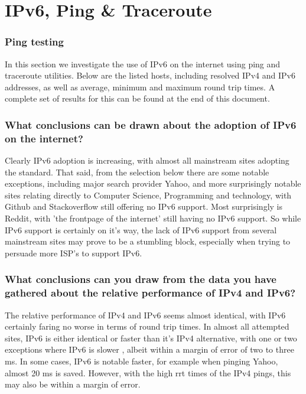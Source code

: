 \part{IPv6, Ping \& Traceroute}
\section{Ping testing}
\begin{normalsize}
In this section we investigate the use of IPv6 on the internet using ping and traceroute utilities.  Below are the listed hosts, including resolved IPv4 and IPv6 addresses, as well as average, minimum and maximum round trip times. A complete set of results for this can be found at the end of this document. 
\end{normalsize}
\section{What conclusions can be drawn about the adoption of IPv6 on the internet?}
\begin{normalsize}
Clearly IPv6 adoption is increasing, with almost all mainstream sites adopting the standard. That said, from the selection below there are some notable exceptions, including major search provider Yahoo, and more surprisingly notable sites relating directly to Computer Science, Programming and technology, with Github and Stackoverflow still offering no IPv6 support. Most surprisingly is Reddit, with 'the frontpage of the internet' still having no IPv6 support. So while IPv6 support is certainly on it's way, the lack of IPv6 support from several mainstream sites may prove to be a stumbling block, especially when trying to persuade more ISP's to support IPv6.
\end{normalsize}
\section{What conclusions can you draw from the data you have gathered about the relative performance of IPv4 and IPv6?}
\begin{normalsize}
The relative performance of IPv4 and IPv6 seems almost identical, with IPv6 certainly faring no worse in terms of round trip times. In almost all attempted sites, IPv6 is either identical or faster than it's IPv4 alternative, with one or two exceptions where IPv6 is slower , albeit within a margin of error of two to three ms. In some cases, IPv6 is notable faster, for example when pinging Yahoo, almost 20 ms is saved. However, with the high rrt times of the IPv4 pings, this may also be within a margin of error. 
\end{normalsize}
